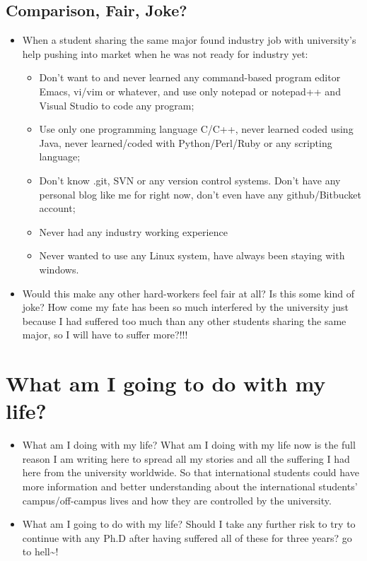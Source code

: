 \documentclass[9pt,b5paper]{article}
\begin{document}
\subsection{Comparison, Fair, Joke?}
\label{sec-10-1}
\begin{itemize}
\item When a student sharing the same major found industry job with university's help pushing into market when he was not ready for industry yet:
\begin{itemize}
\item Don't want to and never learned any command-based program editor Emacs, vi/vim or whatever, and use only notepad or notepad++ and Visual Studio to code any program;
\item Use only one programming language C/C++, never learned coded using Java, never learned/coded with Python/Perl/Ruby or any scripting language;
\item Don't know .git, SVN or any version control systems. Don't have any personal blog like me for right now, don't even have any github/Bitbucket account;
\item Never had any industry working experience
\item Never wanted to use any Linux system, have always been staying with windows.
\end{itemize}
\item Would this make any other hard-workers feel fair at all? Is this some kind of joke? How come my fate has been so much interfered by the university just because I had suffered too much than any other students sharing the same major, so I will have to suffer more?!!!
\end{itemize}

\section{What am I going to do with my life?}
\label{sec-11}
\begin{itemize}
\item What am I doing with my life? What am I doing with my life now is the full reason I am writing here to spread all my stories and all the suffering I had here from the university worldwide. So that international students could have more information and better understanding about the international students' campus/off-campus lives and how they are controlled by the university.
\item What am I going to do with my life? Should I take any further risk to try to continue with any Ph.D after having suffered all of these for three years? go to hell\textasciitilde{}!
\end{itemize}
\end{document}
